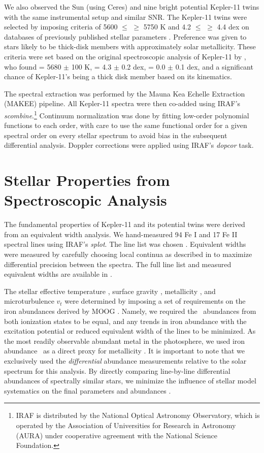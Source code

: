 \documentclass[oneside]{emulateapj}
\begin{document}
We also observed the Sun (using Ceres) and nine bright potential Kepler-11 twins with the same instrumental setup and similar SNR. The Kepler-11 twins were selected by imposing criteria of 5600 $\leq$ \teff$\geq$ 5750 K and 4.2 $\leq$ \logg $\geq$ 4.4 dex on databases of previously published stellar parameters \citep{Adibekyan2012, Bensby2014}. Preference was given to stars likely to be thick-disk members with approximately solar metallicity. These criteria were set based on the original spectroscopic analysis of Kepler-11 by \citet{Lissauer2011}, who found \teff = 5680 $\pm$ 100 K, \logg = 4.3 $\pm$ 0.2 dex, \feh = 0.0 $\pm$ 0.1 dex, and a significant chance of Kepler-11's being a thick disk member based on its kinematics.

The spectral extraction was performed by the Mauna Kea Echelle Extraction (MAKEE) pipeline. All Kepler-11 spectra were then co-added using IRAF's \textit{scombine}.\footnote{IRAF is distributed by the National Optical Astronomy Observatory, which is operated by the Association of Universities for Research in Astronomy (AURA) under cooperative agreement with the National Science Foundation.} Continuum normalization was done by fitting low-order polynomial functions to each order, with care to use the same functional order for a given spectral order on every stellar spectrum to avoid bias in the subsequent differential analysis. Doppler corrections were applied using IRAF's \textit{dopcor} task.


\section{Stellar Properties from Spectroscopic Analysis}
\label{s:characterization}

The fundamental properties of Kepler-11 and its potential twins were derived from an equivalent width analysis. We hand-measured 94 Fe I and 17 Fe II spectral lines using IRAF's \textit{splot}. The line list was chosen . Equivalent widths were measured by carefully choosing local continua as described in \citet{Bedell2014} to maximize differential precision between the spectra. The full line list and measured equivalent widths are available in .

The stellar effective temperature \teff, surface gravity \logg, metallicity \mh, and microturbulence $v_t$ were determined by imposing a set of requirements on the iron abundances derived by MOOG \citep{Sneden1973}. Namely, we required the \feh\ abundances from both ionization states to be equal, and any trends in iron abundance with the excitation potential or reduced equivalent width of the lines to be minimized. As the most readily observable abundant metal in the photosphere, we used iron abundance \feh\ as a direct proxy for metallicity \mh. It is important to note that we exclusively used the \textit{differential} abundance measurements relative to the solar spectrum for this analysis. By directly comparing line-by-line differential abundances of spectrally similar stars, we minimize the influence of stellar model systematics on the final parameters and abundances \citep[see e.g.][]{Ramirez2014}. 
\end{document}
